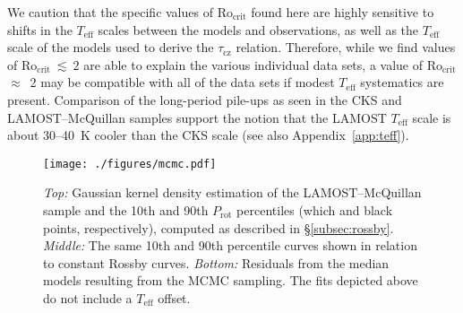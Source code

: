 \documentclass[linenumbers,tighten,trackchanges,twocolumn]{aastex631}
\newcommand{\taucz}{$\tau_\mathrm{cz}$\xspace}
\newcommand{\rocrit}{$\mathrm{Ro_{crit}}$\xspace}
\newcommand{\rocritfinal}{$\mathrm{Ro_{crit}}~\lesssim~2$\xspace}
\newcommand{\lamostmcq}{LAMOST--McQuillan\xspace}
\newcommand{\teff}{\ensuremath{T_{\mathrm{eff}}}\xspace}
\newcommand{\prot}{\ensuremath{P_\mathrm{rot}}\xspace}
\begin{document}
We caution that the specific values of \rocrit found here are highly sensitive to shifts in the \teff scales between the models and observations, as well as the \teff scale of the models used to derive the \taucz relation. Therefore, while we find values of \rocritfinal are able to explain the various individual data sets, a value of \rocrit  $\approx$~2 may be compatible with all of the data sets if modest \teff systematics are present. Comparison of the long-period pile-ups as seen in the CKS and \lamostmcq samples support the notion that the LAMOST \teff scale is about 30--40~K cooler than the CKS scale (see also Appendix~\ref{app:teff}).

\begin{figure}
    \centering
    \texttt{[image: ./figures/mcmc.pdf]}
    \caption{\textit{Top:} Gaussian kernel density estimation of the LAMOST--McQuillan sample and the 10th and 90th \prot percentiles (which and black points, respectively), computed as described in \S\ref{subsec:rossby}. \textit{Middle:} The same 10th and 90th percentile curves shown in relation to constant Rossby curves. \textit{Bottom:} Residuals from the median models resulting from the MCMC sampling. The fits depicted above do not include a \teff offset.}
    \label{fig:mcmc}
\end{figure}
\end{document}
